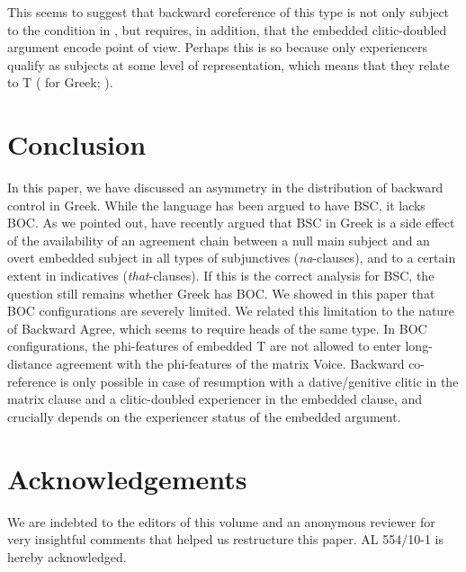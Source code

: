 \documentclass[output=paper]{langsci/langscibook}
\begin{document}
This seems to suggest that backward coreference of this type is not only subject to the condition in , but requires, in addition, that the embedded clitic-doubled argument encode point of view. Perhaps this is so because only experiencers qualify as subjects at some level of representation, which means that they relate to T (\citealt{Anagnostopoulou1999} for Greek; \citealt{Landau2010Locative}). 

\section{Conclusion}%

In this paper, we have discussed an asymmetry in the distribution of backward control in Greek. While the language has been argued to have BSC, it lacks BOC. As we pointed out, \citet{Tsakali2017} have recently argued that BSC in Greek is a side effect of the availability of an agreement chain between a null main subject and an overt embedded subject in all types of subjunctives (\textit{na}{}-clauses), and to a certain extent in indicatives (\textit{that}{}-clauses). If this is the correct analysis for BSC, the question still remains whether Greek has BOC. We showed in this paper that BOC configurations are severely limited. We related this limitation to the nature of Backward Agree, which seems to require heads of the same type. In BOC configurations, the phi-features of embedded T are not allowed to enter long-distance agreement with the phi-features of the matrix Voice. Backward co-reference is only possible in case of resumption with a dative\slash genitive clitic in the matrix clause and a clitic-doubled experiencer in the embedded clause, and crucially depends on the experiencer status of the embedded argument.

\section*{Acknowledgements}

We are indebted to the editors of this volume and an anonymous reviewer for very insightful comments that helped us restructure this paper. AL 554\slash 10-1 is hereby acknowledged.
\end{document}
